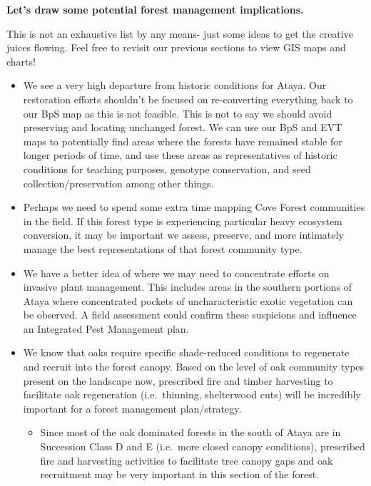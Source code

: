 \documentclass[
]{book}
\providecommand{\tightlist}{%
  \setlength{\itemsep}{0pt}\setlength{\parskip}{0pt}}
\begin{document}
\textbf{Let's draw some potential forest management implications.}

This is not an exhaustive list by any means- just some ideas to get the creative juices flowing. Feel free to revisit our previous sections to view GIS maps and charts!

\begin{itemize}
\tightlist
\item
  We see a very high departure from historic conditions for Ataya. Our restoration efforts shouldn't be focused on re-converting everything back to our BpS map as this is not feasible. This is not to say we should avoid preserving and locating unchanged forest. We can use our BpS and EVT maps to potentially find areas where the forests have remained stable for longer periods of time, and use these areas as representatives of historic conditions for teaching purposes, genotype conservation, and seed collection/preservation among other things.\\
\item
  Perhaps we need to spend some extra time mapping Cove Forest communities in the field. If this forest type is experiencing particular heavy ecosystem conversion, it may be important we assess, preserve, and more intimately manage the best representations of that forest community type.
\item
  We have a better idea of where we may need to concentrate efforts on invasive plant management. This includes areas in the southern portions of Ataya where concentrated pockets of uncharacteristic exotic vegetation can be observed. A field assessment could confirm these suspicions and influence an Integrated Pest Management plan.
\item
  We know that oaks require specific shade-reduced conditions to regenerate and recruit into the forest canopy. Based on the level of oak community types present on the landscape now, prescribed fire and timber harvesting to facilitate oak regeneration (i.e.~thinning, shelterwood cuts) will be incredibly important for a forest management plan/strategy.

  \begin{itemize}
  \tightlist
  \item
    Since most of the oak dominated forests in the south of Ataya are in Succession Class D and E (i.e.~more closed canopy conditions), prescribed fire and harvesting activities to facilitate tree canopy gaps and oak recruitment may be very important in this section of the forest.
  \end{itemize}
\end{itemize}
\end{document}
